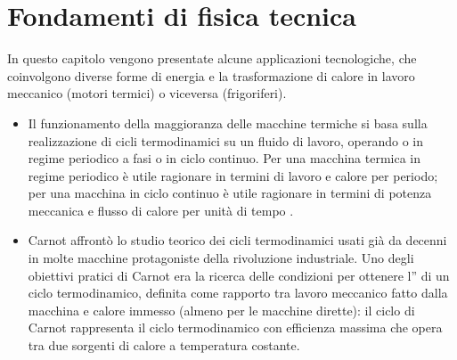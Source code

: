 \documentclass[letterpaper,10pt,italian]{jupyterBook}
\begin{document}
\chapter{Fondamenti di fisica tecnica}
\label{\detokenize{ch/thermodynamics/heat-engine:fondamenti-di-fisica-tecnica}}\label{\detokenize{ch/thermodynamics/heat-engine:physics-hs-thermodynamics-heat-engine}}\label{\detokenize{ch/thermodynamics/heat-engine::doc}}
\sphinxAtStartPar
In questo capitolo vengono presentate alcune applicazioni tecnologiche, che coinvolgono diverse forme di energia e la trasformazione di calore in lavoro meccanico (motori termici) o viceversa (frigoriferi).
\begin{itemize}
\item {} 
\sphinxAtStartPar
{} Il funzionamento della maggioranza delle macchine termiche si basa sulla realizzazione di cicli termodinamici su un fluido di lavoro, operando o in regime periodico a fasi o in ciclo continuo. Per una macchina termica in regime periodico è utile ragionare in termini di lavoro e calore per periodo; per una macchina in ciclo continuo è utile ragionare in termini di potenza meccanica e flusso di calore per unità di tempo \sphinxstylestrong{(!!!)}.  

\item {} 
\sphinxAtStartPar
{} Carnot affrontò lo studio teorico dei cicli termodinamici usati già da decenni in molte macchine protagoniste della rivoluzione industriale. Uno degli obiettivi pratici di Carnot era la ricerca delle condizioni per ottenere l” di un ciclo termodinamico, definita come rapporto tra lavoro meccanico fatto dalla macchina e calore immesso (almeno per le macchine dirette): il ciclo di Carnot rappresenta il ciclo termodinamico con efficienza massima che opera tra due sorgenti di calore a temperatura costante.


\end{itemize}
\end{document}
